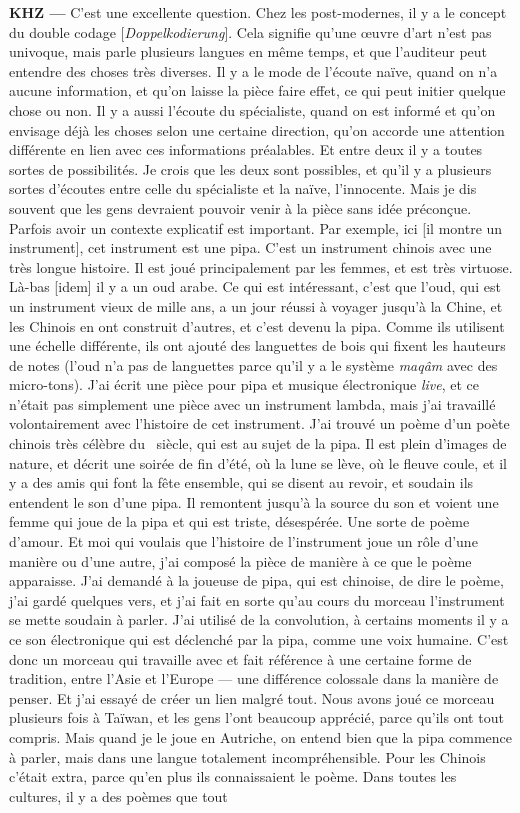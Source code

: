 \documentclass[a4paper,12pt]{article}
\begin{document}
\textbf{KHZ ---} C'est une excellente question. Chez les post-modernes, il y a le concept du double codage [\emph{Doppelkodierung}]. Cela signifie qu'une œuvre d'art n'est pas univoque, mais parle plusieurs langues en même temps, et que l'auditeur peut entendre des choses très diverses. Il y a le mode de l'écoute naïve, quand on n'a aucune information, et qu'on laisse la pièce faire effet, ce qui peut initier quelque chose ou non. Il y a aussi l'écoute du spécialiste, quand on est informé et qu'on envisage déjà les choses selon une certaine direction, qu'on accorde une attention différente en lien avec ces informations préalables. Et entre deux il y a toutes sortes de possibilités. Je crois que les deux sont possibles, et qu'il y a plusieurs sortes d'écoutes entre celle du spécialiste et la naïve, l'innocente. Mais je dis souvent que les gens devraient pouvoir venir à la pièce sans idée préconçue. Parfois avoir un contexte explicatif est important. Par exemple, ici [il montre un instrument], cet instrument est une pipa. C'est un instrument chinois avec une très longue histoire. Il est joué principalement par les femmes, et est très virtuose. Là-bas [idem] il y a un oud arabe. Ce qui est intéressant, c'est que l'oud, qui est un instrument vieux de mille ans, a un jour réussi à voyager jusqu'à la Chine, et les Chinois en ont construit d'autres, et c'est devenu la pipa. Comme ils utilisent une échelle différente, ils ont ajouté des languettes de bois qui fixent les hauteurs de notes (l'oud n'a pas de languettes parce qu'il y a le système \emph{maqâm} avec des micro-tons). J'ai écrit une pièce pour pipa et musique électronique \emph{live}, et ce n'était pas simplement une pièce avec un instrument lambda, mais j'ai travaillé volontairement avec l'histoire de cet instrument. J'ai trouvé un poème d'un poète chinois très célèbre du \VIIIe~siècle, qui est au sujet de la pipa. Il est plein d'images de nature, et décrit une soirée de fin d'été, où la lune se lève, où le fleuve coule, et il y a des amis qui font la fête ensemble, qui se disent au revoir, et soudain ils entendent le son d'une pipa. Il remontent jusqu'à la source du son et voient une femme qui joue de la pipa et qui est triste, désespérée. Une sorte de poème d'amour. Et moi qui voulais que l'histoire de l'instrument joue un rôle d'une manière ou d'une autre, j'ai composé la pièce de manière à ce que le poème apparaisse. J'ai demandé à la joueuse de pipa, qui est chinoise, de dire le poème, j'ai gardé quelques vers, et j'ai fait en sorte qu'au cours du morceau l'instrument se mette soudain à parler. J'ai utilisé de la convolution, à certains moments il y a ce son électronique qui est déclenché par la pipa, comme une voix humaine. C'est donc un morceau qui travaille avec et fait référence à une certaine forme de tradition, entre l'Asie et l'Europe --- une différence colossale dans la manière de penser. Et j'ai essayé de créer un lien malgré tout. Nous avons joué ce morceau plusieurs fois à Taïwan, et les gens l'ont beaucoup apprécié, parce qu'ils ont tout compris. Mais quand je le joue en Autriche, on entend bien que la pipa commence à parler, mais dans une langue totalement incompréhensible. Pour les Chinois c'était extra, parce qu'en plus ils connaissaient le poème. Dans toutes les cultures, il y a des poèmes que tout 
\end{document}
